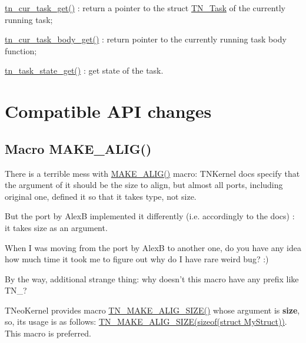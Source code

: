 \begin{DoxyItemize}
\item {\ttfamily \hyperlink{tn__sys_8h_a2ca353dcf362a5aa8d2e5a3960e51410}{tn\+\_\+cur\+\_\+task\+\_\+get()}} \+: return a pointer to the {\ttfamily struct \hyperlink{structTN__Task}{T\+N\+\_\+\+Task}} of the currently running task;
\item {\ttfamily \hyperlink{tn__sys_8h_afa3c83dce52b17c9ee07b34af0fcebab}{tn\+\_\+cur\+\_\+task\+\_\+body\+\_\+get()}} \+: return pointer to the currently running task body function;
\item {\ttfamily \hyperlink{tn__tasks_8h_a18408d825c0dab03511f3aaeeb3ffbb3}{tn\+\_\+task\+\_\+state\+\_\+get()}} \+: get state of the task.
\end{DoxyItemize}\hypertarget{tnkernel_diff_tnkernel_new_api}{}\section{Compatible A\+P\+I changes}\label{tnkernel_diff_tnkernel_new_api}
\hypertarget{tnkernel_diff_tnkernel_diff_make_alig}{}\subsection{Macro M\+A\+K\+E\+\_\+\+A\+L\+I\+G()}\label{tnkernel_diff_tnkernel_diff_make_alig}
There is a terrible mess with {\ttfamily \hyperlink{tn__oldsymbols_8h_aa42d2e6b5b7ff37bd485803fa2cb70a8}{M\+A\+K\+E\+\_\+\+A\+L\+I\+G()}} macro\+: T\+N\+Kernel docs specify that the argument of it should be the size to align, but almost all ports, including original one, defined it so that it takes type, not size.

But the port by Alex\+B implemented it differently (i.\+e. accordingly to the docs) \+: it takes size as an argument.

When I was moving from the port by Alex\+B to another one, do you have any idea how much time it took me to figure out why do I have rare weird bug? \+:)

By the way, additional strange thing\+: why doesn't this macro have any prefix like {\ttfamily T\+N\+\_\+}?

T\+Neo\+Kernel provides macro {\ttfamily \hyperlink{tn__common_8h_a3f48380e8a624edc643319a81192d88e}{T\+N\+\_\+\+M\+A\+K\+E\+\_\+\+A\+L\+I\+G\+\_\+\+S\+I\+Z\+E()}} whose argument is {\bfseries size}, so, its usage is as follows\+: {\ttfamily \hyperlink{tn__common_8h_a3f48380e8a624edc643319a81192d88e}{T\+N\+\_\+\+M\+A\+K\+E\+\_\+\+A\+L\+I\+G\+\_\+\+S\+I\+Z\+E(sizeof(struct My\+Struct))}}. This macro is preferred.

